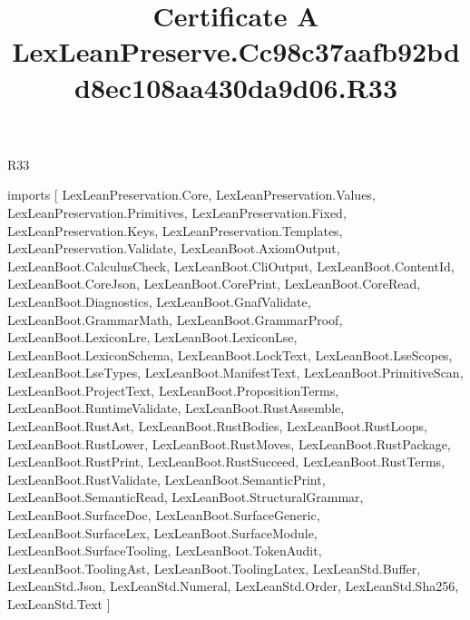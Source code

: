 \begin{lexlean}{R33}
\title{Certificate A LexLeanPreserve.Cc98c37aafb92bdd8ec108aa430da9d06.R33}
\begin{coremodule}
imports [
  LexLeanPreservation.Core,
  LexLeanPreservation.Values,
  LexLeanPreservation.Primitives,
  LexLeanPreservation.Fixed,
  LexLeanPreservation.Keys,
  LexLeanPreservation.Templates,
  LexLeanPreservation.Validate,
  LexLeanBoot.AxiomOutput,
  LexLeanBoot.CalculusCheck,
  LexLeanBoot.CliOutput,
  LexLeanBoot.ContentId,
  LexLeanBoot.CoreJson,
  LexLeanBoot.CorePrint,
  LexLeanBoot.CoreRead,
  LexLeanBoot.Diagnostics,
  LexLeanBoot.GnafValidate,
  LexLeanBoot.GrammarMath,
  LexLeanBoot.GrammarProof,
  LexLeanBoot.LexiconLre,
  LexLeanBoot.LexiconLse,
  LexLeanBoot.LexiconSchema,
  LexLeanBoot.LockText,
  LexLeanBoot.LseScopes,
  LexLeanBoot.LseTypes,
  LexLeanBoot.ManifestText,
  LexLeanBoot.PrimitiveScan,
  LexLeanBoot.ProjectText,
  LexLeanBoot.PropositionTerms,
  LexLeanBoot.RuntimeValidate,
  LexLeanBoot.RustAssemble,
  LexLeanBoot.RustAst,
  LexLeanBoot.RustBodies,
  LexLeanBoot.RustLoops,
  LexLeanBoot.RustLower,
  LexLeanBoot.RustMoves,
  LexLeanBoot.RustPackage,
  LexLeanBoot.RustPrint,
  LexLeanBoot.RustSucceed,
  LexLeanBoot.RustTerms,
  LexLeanBoot.RustValidate,
  LexLeanBoot.SemanticPrint,
  LexLeanBoot.SemanticRead,
  LexLeanBoot.StructuralGrammar,
  LexLeanBoot.SurfaceDoc,
  LexLeanBoot.SurfaceGeneric,
  LexLeanBoot.SurfaceLex,
  LexLeanBoot.SurfaceModule,
  LexLeanBoot.SurfaceTooling,
  LexLeanBoot.TokenAudit,
  LexLeanBoot.ToolingAst,
  LexLeanBoot.ToolingLatex,
  LexLeanStd.Buffer,
  LexLeanStd.Json,
  LexLeanStd.Numeral,
  LexLeanStd.Order,
  LexLeanStd.Sha256,
  LexLeanStd.Text
]


\end{coremodule}
\end{lexlean}
